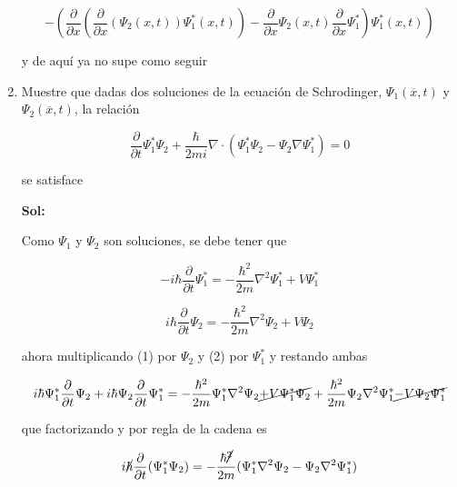 \documentclass[12pt,a4paper]{article}
\begin{document}
\begin{enumerate}
    \begin{equation*}
        \left. - (\frac{\partial }{\partial x} (\frac{\partial}{\partial x}(\Psi_2(x,t))\Psi^*_1(x,t)) - \frac{\partial}{\partial x} \Psi_2 (x,t) \frac{\partial}{\partial x} \Psi^*_1) \Psi^*_1 (x,t)\right)
    \end{equation*}
    
    y de aquí ya no supe como seguir 
    
    
    
    
    
    
    \item Muestre que dadas dos soluciones de la ecuación de Schrodinger, $\Psi_1 (\overline{x},t)$ y $\Psi_2(\overline{x},t)$, la relación
    
    \begin{equation*}
        \frac{\partial}{\partial t} \Psi_{1}^{*} \Psi_2 + \frac{\hbar}{2mi} \nabla \cdot (\Psi_{1}^{*} \Psi_2 - \Psi_2\nabla \Psi_{1}^{*}) = 0
    \end{equation*}
    
    se satisface
    
    \textbf{Sol:}
    
    Como $\Psi_1$ y $\Psi_2$ son soluciones, se debe tener que
    
    \begin{equation}
        -i\hbar \frac{\partial}{\partial t} \Psi_1^* = -\frac{\hbar^2}{2m} \nabla^2 \Psi_1^* + V \Psi_1^*
    \end{equation}
    
    \begin{equation}
        i\hbar \frac{\partial}{\partial t} \Psi_2 = -\frac{\hbar^2}{2m} \nabla^2 \Psi_2 + V \Psi_2
    \end{equation}
    
    ahora multiplicando (1) por $\Psi_2$ y (2) por $\Psi_1^*$ y restando ambas
    
    \begin{equation*}
       i\hbar\Psi_1^* \frac{\partial}{\partial t} \Psi_2 + i\hbar \Psi_2\frac{\partial}{\partial t} \Psi_1^* = -\frac{\hbar^2}{2m}\Psi_1^* \nabla^2 \Psi_2 \cancel{+ V\Psi_1^* \Psi_2}+\frac{\hbar^2}{2m} \Psi_2 \nabla^2 \Psi_1^*\cancel{ - V \Psi_2 \Psi_1^*}
    \end{equation*}
    
    que factorizando y por regla de la cadena es
    
    \begin{equation}
        i\cancel{\hbar} \frac{\partial}{\partial t} (\Psi_1^* \Psi_2) = -\frac{\hbar\cancel{^2}}{2m}(\Psi_1^* \nabla^2 \Psi_2 - \Psi_2 \nabla^2 \Psi_1^*)
    \end{equation}
    

\end{enumerate}
\end{document}
